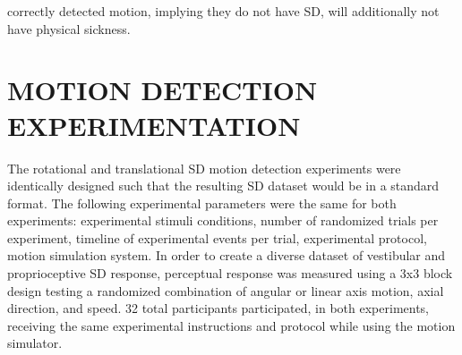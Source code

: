 \documentclass[11pt, onecolumn]{article}
\begin{document}
correctly detected motion, implying they do not have SD, will additionally not have physical sickness.

\section{MOTION DETECTION EXPERIMENTATION}
The rotational and translational SD motion detection experiments were identically designed such that the resulting SD dataset would be in a standard format.  The following experimental parameters were the same for both experiments: experimental stimuli conditions, number of randomized trials per experiment, timeline of experimental events per trial, experimental protocol, motion simulation system.  In order to create a diverse dataset of vestibular and proprioceptive SD response, perceptual response was measured using a 3x3 block design testing a randomized combination of angular or linear axis motion, axial direction, and speed.  32 total participants participated, in both experiments, receiving the same experimental instructions and protocol while using the motion simulator.
\end{document}
